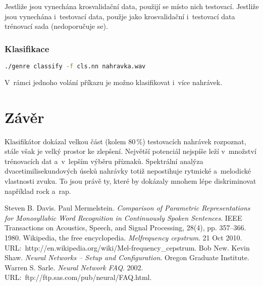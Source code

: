 \documentclass[10pt,a4paper]{article}
\begin{document}
Jestliže jsou vynechána krosvalidační data, použijí se místo nich testovací.
Jestliže jsou vynechána i~testovací data, použje jako krosvalidační i~testovací data
trénovací sada (nedoporučuje se).

\subsubsection{Klasifikace}

\begin{lstlisting}[language=sh]
./genre classify -f cls.nn nahravka.wav
\end{lstlisting}

V~rámci jednoho volání příkazu je možno klasifikovat i~více nahrávek.

\section{Závěr}

Klasifikátor dokázal velkou část (kolem 80\,\%) testovacích nahrávek rozpoznat,
stále však je velký prostor ke zlepšení.
Největší potenciál nejspíše leží v~množství trénovacích dat
a~v~lepším výběru příznaků. Spektrální analýza dvacetimilisekundových
úseků nahrávky totiž nepostihuje rytmické a~melodické vlastnosti zvuku.
To jsou právě ty, které by dokázaly mnohem lépe diskriminovat
například rock a~rap.

\vfill
\begin{thebibliography}{9}
   Steven B. Davis. Paul Mermelstein.
                 \emph{Comparison of Parametric Representations for Monosyllabic Word Recognition in Continuously Spoken Sentences}.
                 IEEE Transactions on Acoustics, Speech, and Signal Processing, 28(4), pp. 357–366. 1980.
   Wikipedia, the free encyclopedia. \emph{Mel\discretionary{-}{-}{-}frequency cepstrum}. 21 Oct 2010. URL:~http://en.wikipedia.org/wiki/Mel-frequency\_cepstrum.
   Bob New. Kevin Shaw. \emph{Neural Networks -- Setup and Configuration}. Oregon Graduate Institute.
   Warren S. Sarle. \emph{Neural Network FAQ}. 2002. URL:~ftp://ftp.sas.com/pub/neural/FAQ.html.
\end{thebibliography}

\newpage
\appendix
\end{document}
